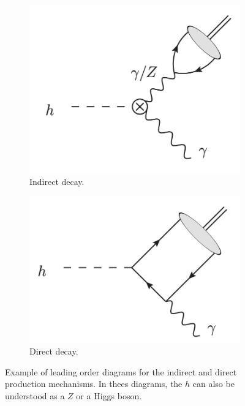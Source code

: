 \begin{figure}[htbp]
  \centering
  \begin{subfigure}[htbp]{0.4\textwidth}
    \centering
    \includegraphics[width=\textwidth]{figures_and_tables/theory/indirect.png}
    \caption{Indirect decay.}
    \label{indirect}
  \end{subfigure}
  \hfill
  \begin{subfigure}[htbp]{0.4\textwidth}
    \centering
    \includegraphics[width=\textwidth]{figures_and_tables/theory/direct.png}
    \caption{Direct decay.}
    \label{direct}
  \end{subfigure}
  \caption{Example of leading order diagrams for the indirect and direct production mechanisms. In thees diagrams, the $h$ can also be understood as a $Z$ or a Higgs boson.}
  \label{direct_indirect}
\end{figure}


